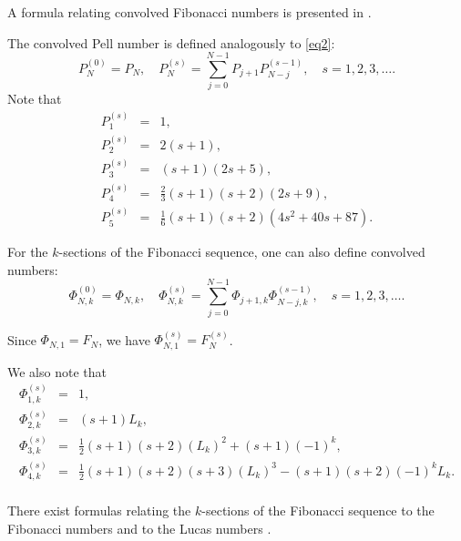 \documentclass{article}
\begin{document}
A formula relating convolved Fibonacci numbers is presented in \cite[formula (18)]{ref7}.

The convolved Pell number is defined analogously to \eqref{eq2}:
$$
P_N^{(0)} = P_N, \quad P_N^{(s)} = \sum_{j = 0}^{N - 1}P_{j + 1}P_{N - j}^{(s - 1)}, \quad s = 1,2,3,\ldots.
$$
Note that
\begin{eqnarray*}
P_1^{(s)} &=& 1, \\
P_2^{(s)} &=& 2(s + 1), \\
P_3^{(s)} &=& (s + 1)(2s + 5), \\
P_4^{(s)} &=& \frac{2}{3}(s + 1)(s + 2)(2s + 9), \\
P_5^{(s)} &=& \frac{1}{6}(s + 1)(s + 2)(4s^2 + 40s + 87).
\end{eqnarray*}

For the $k$-sections of the Fibonacci sequence, one can also define convolved numbers:
$$
\Phi_{N,k}^{(0)} = \Phi_{N,k}, \quad \Phi_{N,k}^{(s)} = \sum_{j = 0}^{N - 1} \Phi_{j + 1,k}\Phi_{N - j,k}^{(s - 1)}, \quad s = 1,2,3,\ldots. 
$$

Since $\Phi_{N,1} = F_N$, we have $\Phi_{N,1}^{(s)} = F_{N}^{(s)}$.

We also note that
\begin{eqnarray*}
\Phi_{1,k}^{(s)} &=& 1, \\
\Phi_{2,k}^{(s)} &=& (s + 1)L_k, \\
\Phi_{3,k}^{(s)} &=& \frac{1}{2}(s + 1)(s + 2)(L_k)^2 + (s + 1)(-1)^k, \\
\Phi_{4,k}^{(s)} &=& \frac{1}{2}(s + 1)(s + 2)(s + 3)(L_k)^3 - (s + 1)(s + 2)(-1)^kL_k. \\
\end{eqnarray*}

There exist formulas relating the $k$-sections of the Fibonacci sequence to the Fibonacci numbers and to the Lucas numbers \cite[formulas (21), (22)]{ref7}.
\end{document}
